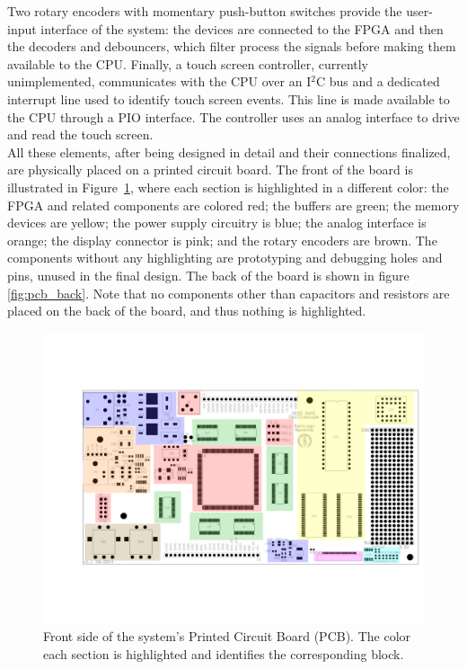 \documentclass[titlepage]{scrartcl}
\begin{document}
	Two rotary encoders with momentary push-button switches provide the user-input interface of the system: the devices are connected to the FPGA and then the decoders and debouncers, which filter process the signals before making them available to the CPU. Finally, a touch screen controller, currently unimplemented, communicates with the CPU over an I$^2$C bus and a dedicated interrupt line used to identify touch screen events. This line is made available to the CPU through a PIO interface. The controller uses an analog interface to drive and read the touch screen.\\
	
	All these elements, after being designed in detail and their connections finalized, are physically placed on a printed circuit board. The front of the board is illustrated in Figure~\ref{fig:pcb}, where each section is highlighted in a different color: the FPGA and related components are colored red; the buffers are green; the memory devices are yellow; the power supply circuitry is blue; the analog interface is orange; the display connector is pink; and the rotary encoders are brown. The components without any highlighting are prototyping and debugging holes and pins, unused in the final design. The back of the board is shown in figure \ref{fig:pcb_back}. Note that no components other than capacitors and resistors are placed on the back of the board, and thus nothing is highlighted.\\

	\begin{figure}[h!]
	\vspace{-2cm}
	\centerline{\includegraphics[width=28cm, angle=90, origin=c]{img/pcb.png}}
		\vspace{-2cm}
                	\caption{Front side of the system's Printed Circuit Board (PCB). The color each section is highlighted and identifies the corresponding block.}
               	\label{fig:pcb}
	\end{figure}
\end{document}
